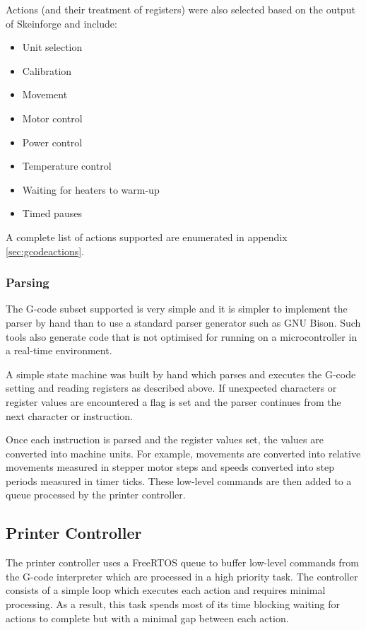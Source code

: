 				Actions (and their treatment of registers) were also selected based on the
				output of Skeinforge and include:
				\begin{itemize}
					\item Unit selection
					\item Calibration
					\item Movement
					\item Motor control
					\item Power control
					\item Temperature control
					\item Waiting for heaters to warm-up
					\item Timed pauses
				\end{itemize}
				A complete list of actions supported are enumerated in appendix
				\ref{sec:gcodeactions}.
			
			\subsubsection{Parsing}
				
				The G-code subset supported is very simple and it is simpler to
				implement the parser by hand than to use a standard parser generator
				such as GNU Bison. Such tools also generate code that is not optimised
				for running on a microcontroller in a real-time environment.
				
				A simple state machine was built by hand which parses and executes the
				G-code setting and reading registers as described above. If unexpected
				characters or register values are encountered a flag is set and the
				parser continues from the next character or instruction.
				
				Once each instruction is parsed and the register values set, the values
				are converted into machine units. For example, movements are converted
				into relative movements measured in stepper motor steps and speeds
				converted into step periods measured in timer ticks. These low-level
				commands are then added to a queue processed by the printer controller.
		
		\subsection{Printer Controller}
			
			The printer controller uses a FreeRTOS queue to buffer low-level commands
			from the G-code interpreter which are processed in a high priority task.
			The controller consists of a simple loop which executes each action and
			requires minimal processing. As a result, this task spends most of its
			time blocking waiting for actions to complete but with a minimal gap
			between each action.
		
